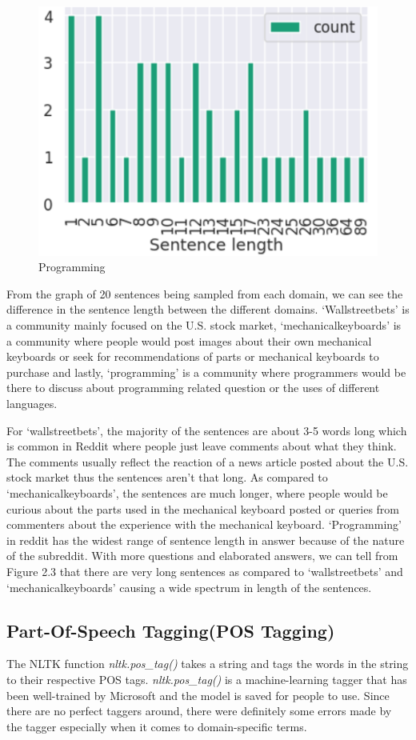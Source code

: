 \documentclass[sigconf,nonacm=true]{acmart}
\begin{document}
\begin{figure}[H]
	\centering
	\includegraphics[scale=0.35]{sentence3.png}
	\caption{Programming}
\end{figure}
From the graph of 20 sentences being sampled from each domain, we can see the difference in the sentence length between the different domains. ‘Wallstreetbets’ is a community mainly focused on the U.S. stock market, ‘mechanicalkeyboards’ is a community where people would post images about their own mechanical keyboards or seek for recommendations of parts or mechanical keyboards to purchase and lastly, ‘programming’ is a community where programmers would be there to discuss about programming related question or the uses of different languages. \smallskip

For ‘wallstreetbets’, the majority of the sentences are about 3-5 words long which is common in Reddit where people just leave comments about what they think. The comments usually reflect the reaction of a news article posted about the U.S. stock market thus the sentences aren’t that long. As compared to ‘mechanicalkeyboards’, the sentences are much longer, where people would be curious about the parts used in the mechanical keyboard posted or queries from commenters about the experience with the mechanical keyboard. ‘Programming’ in reddit has the widest range of sentence length in answer because of the nature of the subreddit. With more questions and elaborated answers, we can tell from Figure 2.3 that there are very long sentences as compared to ‘wallstreetbets’ and ‘mechanicalkeyboards’ causing a wide spectrum in length of the sentences.
\subsection{Part-Of-Speech Tagging(POS Tagging)}
The NLTK function \textit{nltk.pos\_tag()} takes a string and tags the words in the string to their respective POS tags. \textit{nltk.pos\_tag()} is a machine-learning tagger that has been well-trained by Microsoft and the model is saved for people to use. Since there are no perfect taggers around, there were definitely some errors made by the tagger especially when it comes to domain-specific terms.
\end{document}
